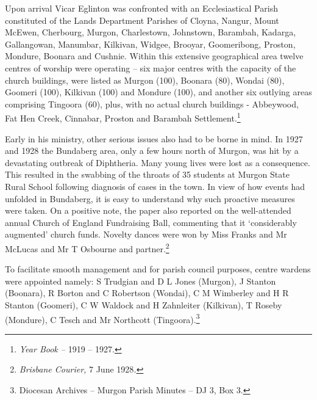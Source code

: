 Upon arrival Vicar Eglinton was confronted with an Ecclesiastical Parish constituted of the Lands Department Parishes of Cloyna, Nangur, Mount McEwen, Cherbourg, Murgon, Charlestown, Johnstown, Barambah, Kadarga, Gallangowan, Manumbar, Kilkivan, Widgee, Brooyar, Goomeribong, Proston, Mondure, Boonara and Cushnie. Within this extensive geographical area twelve centres of worship were operating -- six major centres with the capacity of the church buildings, were listed as Murgon (100), Boonara (80), Wondai (80), Goomeri (100), Kilkivan (100) and Mondure (100), and another six outlying areas comprising Tingoora (60), plus, with no actual church buildings - Abbeywood, Fat Hen Creek, Cinnabar, Proston and Barambah Settlement.\footnote{\emph{Year Book --} 1919 -- 1927.}


Early in his ministry, other serious issues also had to be borne in mind. In 1927 and 1928 the Bundaberg area, only a few hours north of Murgon, was hit by a devastating outbreak of Diphtheria. Many young lives were lost as a consequence. This resulted in the swabbing of the throats of 35 students at Murgon State Rural School following diagnosis of cases in the town. In view of how events had unfolded in Bundaberg, it is easy to understand why such proactive measures were taken. On a positive note, the paper also reported on the well-attended annual Church of England Fundraising Ball, commenting that it `considerably augmented' church funds. Novelty dances were won by Miss Franks and Mr McLucas and Mr T Osbourne and partner.\footnote{\emph{Brisbane Courier,} 7 June 1928\emph{.}}


To facilitate smooth management and for parish council purposes, centre wardens were appointed namely: S Trudgian and D L Jones (Murgon), J Stanton (Boonara), R Borton and C Robertson (Wondai), C M Wimberley and H R Stanton (Goomeri), C W Waldock and H Zahnleiter (Kilkivan), T Roseby (Mondure), C Tesch and Mr Northcott (Tingoora).\footnote{Diocesan Archives -- Murgon Parish Minutes -- DJ 3, Box 3.}


